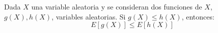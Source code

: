 \begin{coro}
    Dada $X$ una variable aleatoria y se consideran dos funciones de $X$, $g(X), h(X)$, variables aleatorias. Si $g(X)\leq h(X)$, entonces:
    \begin{equation*}
        E[g(X)]\leq E[h(X)]
    \end{equation*}
\end{coro}
\begin{comment}
\begin{proof}
    Realizamos distinción entre caso discreto y continuo:
    \begin{itemize}
        \item \underline{Caso discreto}. Suponemos $Re_X = E$.

        Sabemos que $f(x_i)\geq 0 \;\forall x_i\in E$. Entonces, no cambia el sentido de la desigualdad, por lo que:
        \begin{equation*}
            g(x_i)f(x_i)\leq h(x_i)f(x_i) \qquad \forall x_i\in E
        \end{equation*}

        Por tanto, tenemos que:
        \begin{equation*}
            \sum_{x_i\in E}g(x_i)f(x_i)\leq \sum_{x_i\in E} h(x_i)f(x_i)
        \end{equation*}
        ya que se cumple para todos los sumandos. Por tanto, usando las definiciones, tenemos que:
        \begin{equation*}
            E[g(X)]\leq E[h(X)]
        \end{equation*}

        \item \underline{Caso continuo}. Suponemos $Re_X = [a,b]$.

        Sabemos que $f(x)\geq 0 \;\forall x\in [a,b]$. Entonces, no cambia el sentido de la desigualdad, por lo que:
        \begin{equation*}
            g(x)f(x)\leq h(x)f(x) \qquad \forall x_i\in [a,b]
        \end{equation*}

        Por tanto, ya que el operador integral mantiene las relaciones de orden, tenemos que:
        \begin{equation*}
            \int_a^b g(x)f(x)\;dx\leq \int_a^b h(x)f(x)\;dx
        \end{equation*}
        
        Por tanto, usando las definiciones, tenemos que:
        \begin{equation*}
            E[g(X)]\leq E[h(X)]
        \end{equation*}
    \end{itemize}
\end{proof}
\end{comment}



